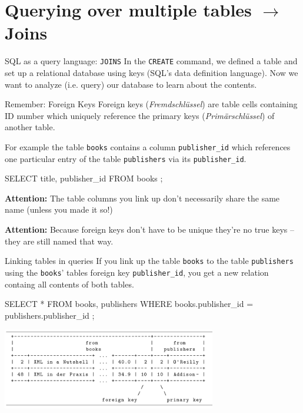 
\section{Querying over multiple tables $\to$ Joins}

\begin{frame}{SQL as a query language: \texttt{JOINS}}
\footnotesize
In the \texttt{CREATE} command, we defined a table and set up a relational database using keys (SQL's data definition language). Now we want to analyze (i.e. query) our database to learn about the contents.

\begin{block}{Remember: Foreign Keys}\footnotesize
Foreign keys (\emph{Fremdschlüssel}) are table cells containing ID number which uniquely reference the primary keys (\emph{Primärschlüssel}) of another table.

For example the table \texttt{books} contains a column \texttt{publisher\_id} which references one particular entry of the table \texttt{publishers} via its \texttt{publisher\_id}.

\begin{sqlcode}
    SELECT title, publisher_id FROM books ;
\end{sqlcode}

\footnotesize
\textbf{Attention:} The table columns you link up don't necessarily share the same name (unless you made it so!) 

\textbf{Attention:} Because foreign keys don't have to be unique they're no true keys -- they are still named that way. 
\end{block}

\framebreak
\begin{block}{Linking tables in queries}\small 
If you link up the table \texttt{books} to the table \texttt{publishers} using the \texttt{books}' tables foreign key \texttt{publisher\_id}, you get a new relation containg all contents of both tables.
\begin{sqlcode}
SELECT *
FROM books, publishers
WHERE books.publisher_id = publishers.publisher_id ;
\end{sqlcode}

\centering\includegraphics[width=0.7\textwidth]{img/foreign-keys.png}
\medskip


\end{block}
\end{frame}
